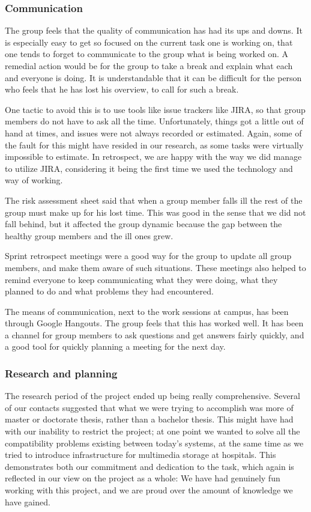 \subsubsection{Communication}
The group feels that the quality of communication has had its ups and downs. It is especially easy to get so focused on the current task one is working on, that one tends to forget to communicate to the group what is being worked on. A remedial action would be for the group to take a break and explain what each and everyone is doing. It is understandable that it can be difficult for the person who feels that he has lost his overview, to call for such a break.

One tactic to avoid this is to use tools like issue trackers like JIRA, so that group members do not have to ask all the time. Unfortunately, things got a little out of hand at times, and issues were not always recorded or estimated. Again, some of the fault for this might have resided in our research, as some tasks were virtually impossible to estimate. In retrospect, we are happy with the way we did manage to utilize JIRA, considering it being the first time we used the technology and way of working.

The risk assessment sheet said that when a group member falls ill the rest of the group must make up for his lost time. This was good in the sense that we did not fall behind, but it affected the group dynamic because the gap between the healthy group members and the ill ones grew.

Sprint retrospect meetings were a good way for the group to update all group members, and make them aware of such situations. These meetings also helped to remind everyone to keep communicating what they were doing, what they planned to do and what problems they had encountered.

The means of communication, next to the work sessions at campus, has been through Google Hangouts. The group feels that this has worked well. It has been a channel for group members to ask questions and get answers fairly quickly, and a good tool for quickly planning a meeting for the next day.

\subsubsection{Research and planning}
\label{researchEval}
The research period of the project ended up being really comprehensive. Several of our contacts suggested that what we were trying to accomplish was more of master or doctorate thesis, rather than a bachelor thesis. This might have had with our inability to restrict the project; at one point we wanted to solve all the compatibility problems existing between today's systems, at the same time as we tried to introduce infrastructure for multimedia storage at hospitals. This demonstrates both our commitment and dedication to the task, which again is reflected in our view on the project as a whole: We have had genuinely fun working with this project, and we are proud over the amount of knowledge we have gained.

